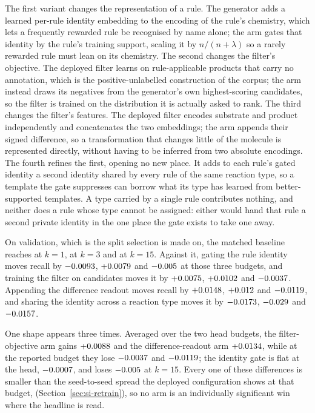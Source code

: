 \documentclass[journal=jcisd8,manuscript=suppinfo,layout=onecolumn]{achemso}
\begin{document}
The first variant changes the representation of a rule. The generator adds a learned per-rule
identity embedding to the encoding of the rule's chemistry, which lets a frequently rewarded rule
be recognised by name alone; the arm gates that identity by the rule's
training support, scaling it by $n/(n+\lambda)$ so a rarely rewarded rule must lean on its
chemistry. The second changes the filter's objective. The deployed filter learns on
rule-applicable products that carry no annotation, which is the positive-unlabelled construction of
the corpus; the arm instead draws its negatives from the generator's own highest-scoring
candidates, so the filter is trained on the distribution it is actually asked to rank. The third
changes the filter's features. The deployed filter encodes substrate and product independently and
concatenates the two embeddings; the arm appends their signed difference, so a transformation that
changes little of the molecule is represented directly, without having to be inferred from two
absolute encodings. The fourth refines the first, opening no new place. It adds to each
rule's gated identity a second identity shared by every rule of the same reaction type, so a
template the gate suppresses can borrow what its type has learned from better-supported templates.
A type carried by a single rule contributes nothing, and neither does a rule whose type cannot be
assigned: either would hand that rule a second private identity in the one place the gate exists
to take one away.

On validation, which is the split selection is made on, the matched baseline reaches
\numSurvivorsBaseOne{} at $k=1$, \numSurvivorsBaseThree{} at $k=3$ and
\numSurvivorsBaseOneFive{} at $k=15$. Against it, gating the rule identity moves recall by
$-0.0093{}$, $+0.0079{}$ and $-0.005{}$ at
those three budgets, and training the filter on candidates moves it by
$+0.0075{}$, $+0.0102{}$ and
$-0.0037{}$. Appending the difference readout moves recall by
$+0.0148{}$, $+0.012{}$ and
$-0.0119{}$, and sharing the identity across a reaction type moves it by
$-0.0173{}$, $-0.029{}$ and $-0.0157{}$.

One shape appears three times. Averaged over the two head budgets, the filter-objective arm gains
$+0.0088{}$ and the difference-readout arm $+0.0134{}$,
while at the reported budget they lose $-0.0037{}$ and
$-0.0119{}$; the identity gate is flat at the head,
$-0.0007{}$, and loses $-0.005{}$ at $k=15$. Every one of these
differences is smaller than the seed-to-seed spread the deployed configuration shows at that
budget, \numSurvivorsSdOneFive{} (Section~\ref{sec:si-retrain}), so no arm is an individually
significant win where the headline is read.
\end{document}
